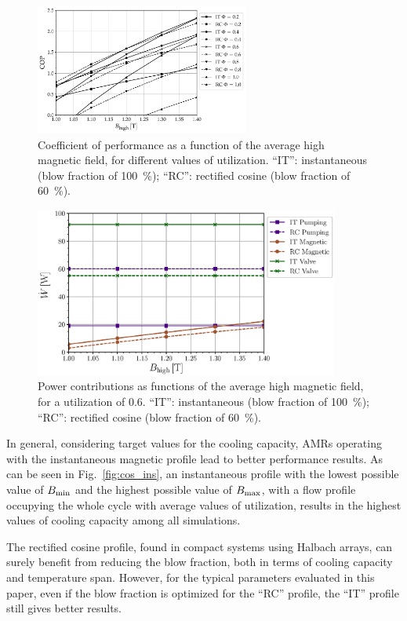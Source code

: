 \documentclass[referee]{svjour3}
\begin{document}
\begin{figure}[!ht]
  \centering
\includegraphics[width=7cm]{COP_B_comp_f_1_same_minimum}
  \caption{Coefficient of performance as a function of the  average high magnetic field, for different values of utilization. ``IT'': instantaneous (blow fraction of \SI{100}{\percent}); ``RC'': rectified cosine  (blow fraction of \SI{60}{\percent}).}
 \label{fig:cos_ins_cop}
\end{figure}



\begin{figure}[!ht]
  \centering
  \includegraphics[width=10cm]{W_B_comp_f_1_Phi_60_same_minimum}
  \caption{Power contributions as functions of the average high magnetic field, for a utilization of 0.6. ``IT'': instantaneous (blow fraction of \SI{100}{\percent}); ``RC'': rectified cosine  (blow fraction of \SI{60}{\percent}).}
  \label{fig:cos_ins_w}
\end{figure}

In general, considering target values for the cooling capacity, AMRs operating with the instantaneous magnetic profile lead to better performance results. As can be seen in Fig.~\ref{fig:cos_ins}, an instantaneous profile with the lowest possible value of $B_{\mathrm{min}}$ and the highest possible value of $B_{\mathrm{max}}$, with a flow profile occupying the whole cycle with average values of utilization, results in the highest values of cooling capacity among all simulations. 

The rectified cosine profile, found in compact systems using Halbach arrays, can surely benefit from reducing the blow fraction, both in terms of cooling capacity and temperature span. However, for the typical parameters evaluated in this paper, even if the blow fraction is optimized for the ``RC'' profile, the ``IT'' profile still gives better results.
\end{document}

